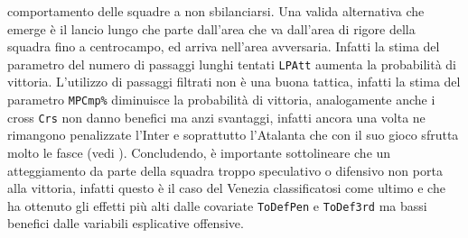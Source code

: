 comportamento delle squadre a non sbilanciarsi. Una valida alternativa che emerge è il lancio lungo che parte dall'area che va dall'area di rigore della squadra fino a centrocampo, ed arriva nell'area avversaria. Infatti la stima del parametro del numero di passaggi lunghi tentati \texttt{LPAtt} aumenta la probabilità di vittoria. L'utilizzo di passaggi filtrati non è una buona tattica, infatti la stima del parametro \texttt{MPCmp\%} diminuisce la probabilità di vittoria, analogamente anche i cross \texttt{Crs} non danno benefici ma anzi svantaggi, infatti ancora una volta ne rimangono penalizzate l'Inter e soprattutto l'Atalanta che con il suo gioco sfrutta molto le fasce (vedi \textit{\cite{site:ataGioco}}). Concludendo, è importante sottolineare che un atteggiamento da parte della squadra troppo speculativo o difensivo non porta alla vittoria, infatti questo è il caso del Venezia classificatosi come ultimo e che ha ottenuto gli effetti più alti dalle covariate \texttt{ToDefPen} e \texttt{ToDef3rd} ma bassi benefici dalle variabili esplicative offensive.